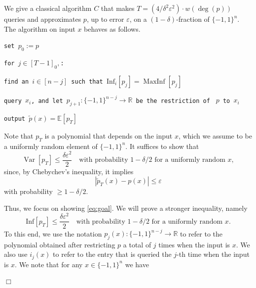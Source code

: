 \documentclass[11pt]{article}
\DeclareMathOperator{\var}{Var}
\DeclareMathOperator{\maxinf}{MaxInf}
\newcommand{\R}{\mathbb{R}} %
\newcommand{\1}{\mathbf{1}}
\newcommand\Inf{\mathrm{Inf}}
\newcommand{\eps}{\varepsilon}
\theoremstyle{plain}
\theoremstyle{definition}
\theoremstyle{remark}
\renewenvironment{proof}[1][]{
    	\begin{trivlist}
     	\item[\hspace{\labelsep}{\em\noindent Proof#1:\/}]}
     	{{\hfill$\Box$}
    	\end{trivlist}
  }
\begin{document}
\begin{proof} We give a classical algorithm
$C$ that makes $T=(4/\delta^2\eps^2)\cdot w(\deg(p))$ queries and approximates $p$, up to error $\eps$, on a $(1-\delta)$-fraction of $\{-1,1\}^{n}$. The algorithm on input $x$ behaves as follows. 

\bigskip

\texttt{\qquad set }$p_{0}:=p$

\texttt{\qquad for }$j\in [T-1]_0,$\texttt{:}

\texttt{\qquad\qquad find an }$i\in\left[  {n}-j\right]  $\texttt{\ such
that }$\Inf_i[p_j]=\maxinf[p_j]$

\texttt{\qquad\qquad query }$x_{i}$\texttt{, and let }$p_{j+1}
:\{-1,1\}^{{n}-j}\rightarrow\mathbb{R}$\texttt{\ be the restriction of } $p$\texttt{ to }$x_i$

\qquad \texttt{output }$\widetilde p(x)=\mathbb E[p_{T}]$
\bigskip

Note that $p_T$ is a polynomial that depends on the input $x$, which we assume to be a uniformly random element of $\{-1,1\}^{n}$. It suffices to show that 
\begin{equation}\label{eq:goal}
    \var [p_T]\leq \frac{\delta\eps^2}{2}\quad \text{with probability } 1-\delta/2 \text{ for a uniformly random } x,
\end{equation}
 since, by Chebychev's inequality,  it implies 
\begin{equation*}
    |\widetilde p_T(x)-p(x)|\leq \eps
\end{equation*}
with probability $\geq 1-\delta/2.$ 

Thus, we focus on showing \cref{eq:goal}. We will prove a stronger inequality, namely 
\begin{equation}\label{eq:goal2}
    \Inf [p_T]\leq \frac{\delta\eps^2}{2}\quad \text{with probability } 1-\delta/2 \text{ for a uniformly random } x.
\end{equation}
To this end, we use the notation $p_j(x):\{-1,1\}^{n-j}\to \R$ to refer to the polynomial obtained after restricting $p$ a total of $j$ times when the input is $x$. We also use $i_j(x)$ to refer to the entry that is queried the $j$-th time when the input is $x$. We note that for any $x\in \{-1,1\}^n$ we have


\end{proof}
\end{document}
